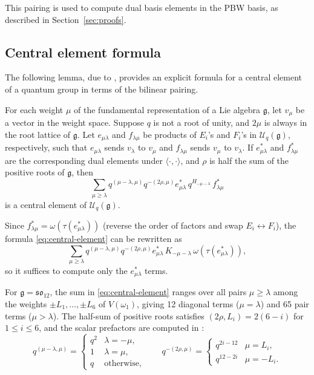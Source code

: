 \documentclass{ximera}
\newcommand{\so}{\mathfrak{so}}
\newcommand{\Uq}{\mathcal{U}_q}
\begin{document}
This pairing is used to compute dual basis elements in the PBW basis, as described in Section~\ref{sec:proofs}.

\subsection{Central element formula}

The following lemma, due to \cite[Lemma~3.1]{Kuan_JPhysA}, provides an explicit formula for a central element of a quantum group in terms of the bilinear pairing.

\begin{lemma}\label{lem:central}
    For each weight $\mu$ of the fundamental representation of a Lie algebra $\mathfrak{g}$, let $v_\mu$ be a vector in the weight space. Suppose $q$ is not a root of unity, and $2\mu$ is always in the root lattice of $\mathfrak{g}$. Let $e_{\mu\lambda}$ and $f_{\lambda\mu}$ be products of $E_i$'s and $F_i$'s in $\Uq(\mathfrak{g})$, respectively, such that $e_{\mu\lambda}$ sends $v_\lambda$ to $v_\mu$ and $f_{\lambda\mu}$ sends $v_\mu$ to $v_\lambda$. If $e_{\mu\lambda}^*$ and $f_{\lambda\mu}^*$ are the corresponding dual elements under $\langle \cdot, \cdot \rangle$, and $\rho$ is half the sum of the positive roots of $\mathfrak{g}$, then
    \begin{equation}\label{eq:central-element}
        \sum_{\mu\geq\lambda} q^{(\mu - \lambda, \mu)} q^{-(2\rho, \mu)} e_{\mu\lambda}^*\,q^{H_{-\mu-\lambda}}\,f_{\lambda\mu}^*
    \end{equation}
    is a central element of $\Uq(\mathfrak{g})$.
\end{lemma}

Since $f_{\lambda\mu}^* = \omega(\tau(e_{\mu\lambda}^*))$ (reverse the order of factors and swap $E_i \leftrightarrow F_i$), the formula \eqref{eq:central-element} can be rewritten as
\begin{equation}\label{eq:central-tau}
    \sum_{\mu\geq\lambda} q^{(\mu - \lambda, \mu)} q^{-(2\rho, \mu)} e_{\mu\lambda}^*\,K_{-\mu-\lambda}\,\omega(\tau(e_{\mu\lambda}^*)),
\end{equation}
so it suffices to compute only the $e^*_{\mu\lambda}$ terms.

For $\mathfrak{g} = \so_{12}$, the sum in \eqref{eq:central-element} ranges over all pairs $\mu \geq \lambda$ among the weights $\pm L_1, \ldots, \pm L_6$ of $V(\omega_1)$, giving 12 diagonal terms ($\mu = \lambda$) and 65 pair terms ($\mu > \lambda$). The half-sum of positive roots satisfies $(2\rho, L_i) = 2(6 - i)$ for $1 \leq i \leq 6$, and the scalar prefactors are computed in \cite[Section~2.1.1]{kuan2020}:
$$q^{(\mu - \lambda, \mu)} = \begin{cases} q^2 & \lambda = -\mu, \\ 1 & \lambda = \mu, \\ q & \text{otherwise,} \end{cases} \qquad q^{-(2\rho, \mu)} = \begin{cases} q^{2i - 12} & \mu = L_i, \\ q^{12 - 2i} & \mu = -L_i. \end{cases}$$
\end{document}
